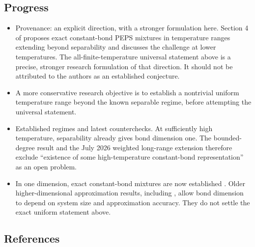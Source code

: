\subsection*{Progress}

\begin{itemize}
  \item Provenance: an explicit direction, with a stronger formulation here. Section 4 of  proposes exact constant-bond PEPS mixtures in temperature ranges extending beyond separability and discusses the challenge at lower temperatures. The all-finite-temperature universal statement above is a precise, stronger research formulation of that direction. It should not be attributed to the authors as an established conjecture.

  \item A more conservative research objective is to establish a nontrivial uniform temperature range beyond the known separable regime, before attempting the universal statement.

  \item Established regimes and latest counterchecks. At sufficiently high temperature, separability already gives bond dimension one. The bounded-degree result  and the July 2026 weighted long-range extension  therefore exclude “existence of some high-temperature constant-bond representation” as an open problem.

  \item In one dimension, exact constant-bond mixtures are now established . Older higher-dimensional approximation results, including , allow bond dimension to depend on system size and approximation accuracy. They do not settle the exact uniform statement above.
\end{itemize}

\subsection*{References}

